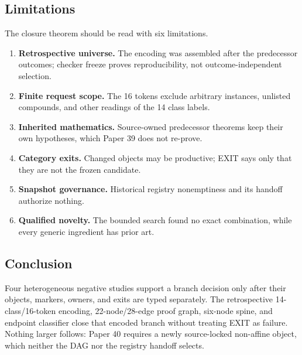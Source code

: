 \subsection{Limitations}

The closure theorem should be read with six limitations.
\begin{enumerate}[nosep]
  \item \textbf{Retrospective universe.}  The encoding was assembled after the
  predecessor outcomes; checker freeze proves reproducibility, not
  outcome-independent selection.
  \item \textbf{Finite request scope.}  The 16 tokens exclude arbitrary
  instances, unlisted compounds, and other readings of the 14 class labels.
  \item \textbf{Inherited mathematics.}  Source-owned predecessor theorems keep
  their own hypotheses, which Paper 39 does not re-prove.
  \item \textbf{Category exits.}  Changed objects may be productive; EXIT says
  only that they are not the frozen candidate.
  \item \textbf{Snapshot governance.}  Historical registry nonemptiness and its
  handoff authorize nothing.
  \item \textbf{Qualified novelty.}  The bounded search found no exact
  combination, while every generic ingredient has prior art.
\end{enumerate}

\subsection{Conclusion}

Four heterogeneous negative studies support a branch decision only after their
objects, markers, owners, and exits are typed separately.  The retrospective
14-class/16-token encoding, 22-node/28-edge proof graph, six-node spine, and
endpoint classifier close that encoded branch without treating EXIT as
failure.  Nothing larger follows: Paper 40 requires a newly source-locked
non-affine object, which neither the DAG nor the registry handoff selects.
